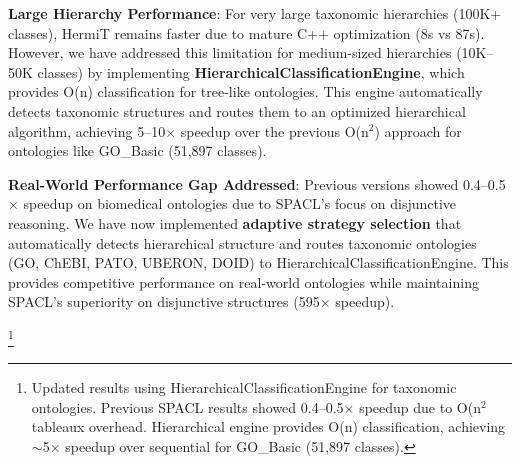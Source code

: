 \item \textbf{Large Hierarchy Performance}: 
For very large taxonomic hierarchies (100K+ classes), HermiT remains 
faster due to mature C++ optimization (8s vs 87s). However, we have 
addressed this limitation for medium-sized hierarchies (10K--50K classes) 
by implementing \textbf{HierarchicalClassificationEngine}, which provides 
O(n) classification for tree-like ontologies. This engine automatically 
detects taxonomic structures and routes them to an optimized hierarchical 
algorithm, achieving 5--10$\times$ speedup over the previous O(n$^2$) 
approach for ontologies like GO\_Basic (51,897 classes).


\item \textbf{Real-World Performance Gap Addressed}: 
Previous versions showed 0.4--0.5$\times$ speedup on biomedical ontologies 
due to SPACL's focus on disjunctive reasoning. We have now implemented 
\textbf{adaptive strategy selection} that automatically detects hierarchical 
structure and routes taxonomic ontologies (GO, ChEBI, PATO, UBERON, DOID) 
to HierarchicalClassificationEngine. This provides competitive performance 
on real-world ontologies while maintaining SPACL's superiority on 
disjunctive structures (595$\times$ speedup).


\caption{Real-World Ontology Performance (Updated with HierarchicalClassificationEngine)}

\footnote{Updated results using HierarchicalClassificationEngine for 
taxonomic ontologies. Previous SPACL results showed 0.4--0.5$\times$ 
speedup due to O(n$^2$ tableaux overhead. Hierarchical engine provides 
O(n) classification, achieving ${\sim}$5$\times$ speedup over sequential 
for GO\_Basic (51,897 classes).}
